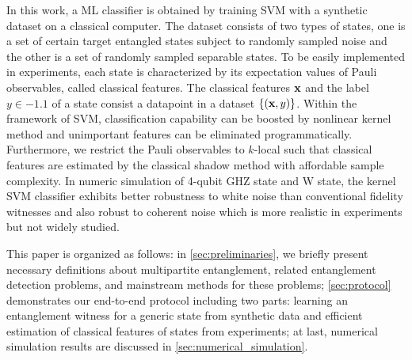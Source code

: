 \documentclass[
aps,
pra,
twocolumn,
floatfix,
]{revtex4-2}
\theoremstyle{plain}
\theoremstyle{definition}
\newcommand{\entangled}{\textsc{entangled}}
\newcommand{\qi}[1]{\textcolor{blue}{(Qi: #1)}}
\begin{document}
In this work, a ML classifier is obtained by training SVM with a synthetic dataset on a classical computer.
The dataset consists of two types of states, one is a set of certain target entangled states subject to randomly sampled noise and the other is a set of randomly sampled separable states.
To be easily implemented in experiments, each state is characterized by its expectation values of Pauli observables, called classical features.
The classical features $\vb{x}$ and the label $y\in\qty{-1,1}$ of a state consist a datapoint in a dataset $\qty{(\vb{x},y)}$.
Within the framework of SVM, classification capability can be boosted by nonlinear kernel method and unimportant features can be eliminated programmatically. 
Furthermore, we restrict the Pauli observables to $k$-local such that classical features are estimated by the classical shadow method \cite{huangPredictingManyProperties2020} with affordable sample complexity.
In numeric simulation of 4-qubit GHZ state and W state, the kernel SVM classifier exhibits better robustness to white noise than conventional fidelity witnesses and also robust to coherent noise which is more realistic in experiments but not widely studied. 

This paper is organized as follows: in \cref{sec:preliminaries}, we briefly present necessary definitions about multipartite entanglement, related entanglement detection problems, and mainstream methods for these problems;
\cref{sec:protocol} demonstrates our end-to-end protocol including two parts: learning an entanglement witness for a generic state from synthetic data and efficient estimation of classical features of states from experiments;
at last, numerical simulation results are discussed in \cref{sec:numerical_simulation}.
\end{document}
